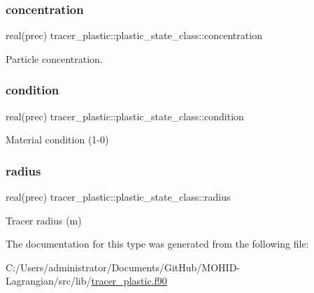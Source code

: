 \subsubsection{\texorpdfstring{concentration}{concentration}}
{\footnotesize\ttfamily real(prec) tracer\+\_\+plastic\+::plastic\+\_\+state\+\_\+class\+::concentration\hspace{0.3cm}{\ttfamily [private]}}



Particle concentration. 

\mbox{\label{structtracer__plastic_1_1plastic__state__class_a6420065359daf0885201b79212f13b5f}} 
\subsubsection{\texorpdfstring{condition}{condition}}
{\footnotesize\ttfamily real(prec) tracer\+\_\+plastic\+::plastic\+\_\+state\+\_\+class\+::condition\hspace{0.3cm}{\ttfamily [private]}}



Material condition (1-\/0) 

\mbox{\label{structtracer__plastic_1_1plastic__state__class_a88e8fcff3faa943e9134fd3b43264d38}} 
\subsubsection{\texorpdfstring{radius}{radius}}
{\footnotesize\ttfamily real(prec) tracer\+\_\+plastic\+::plastic\+\_\+state\+\_\+class\+::radius\hspace{0.3cm}{\ttfamily [private]}}



Tracer radius (m) 



The documentation for this type was generated from the following file\+:\begin{DoxyCompactItemize}
\item 
C\+:/\+Users/administrator/\+Documents/\+Git\+Hub/\+M\+O\+H\+I\+D-\/\+Lagrangian/src/lib/\mbox{\hyperlink{tracer__plastic_8f90}{tracer\+\_\+plastic.\+f90}}\end{DoxyCompactItemize}

